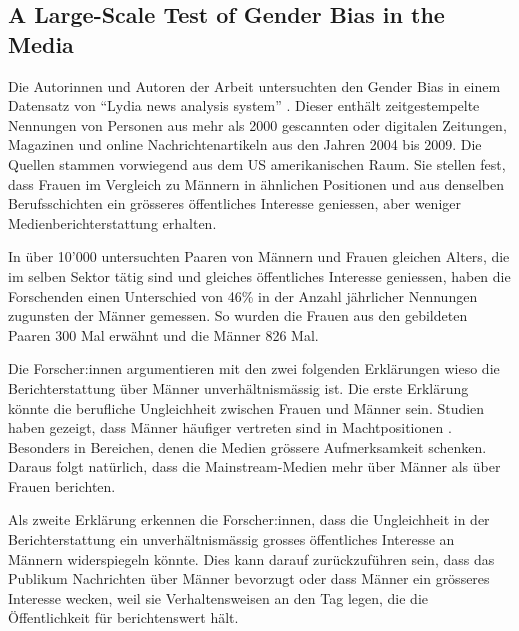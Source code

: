 \subsection{A Large-Scale Test of Gender Bias in the Media}
Die Autorinnen und Autoren der Arbeit  \cite{gender_bias_in_media} untersuchten den Gender Bias in einem
Datensatz von \enquote{Lydia news analysis system} \cite{lydia}. Dieser enthält zeitgestempelte Nennungen von Personen aus
mehr als 2000 gescannten oder digitalen Zeitungen, Magazinen und online Nachrichtenartikeln aus den Jahren 2004 bis 2009.
Die Quellen stammen vorwiegend aus dem US amerikanischen Raum. 
Sie stellen fest, dass Frauen im Vergleich zu Männern in ähnlichen Positionen und aus denselben Berufsschichten ein grösseres öffentliches 
Interesse geniessen, aber weniger Medienberichterstattung erhalten.

In über 10'000 untersuchten Paaren von Männern und Frauen gleichen Alters, die im selben Sektor tätig sind und gleiches öffentliches
Interesse geniessen, haben die Forschenden einen Unterschied von 46\% in der Anzahl jährlicher Nennungen zugunsten der Männer gemessen.
So wurden die Frauen aus den gebildeten Paaren 300 Mal erwähnt und die Männer 826 Mal.


Die Forscher:innen argumentieren mit den zwei folgenden Erklärungen wieso die Berichterstattung über Männer unverhältnismässig ist.
Die erste Erklärung könnte die berufliche Ungleichheit zwischen Frauen und Männer sein.
Studien haben gezeigt, dass Männer häufiger vertreten sind in Machtpositionen
\cite{gender_inequality_in_labor_markets,gender_revolution}. 
Besonders in Bereichen, denen die Medien grössere Aufmerksamkeit schenken.
Daraus folgt natürlich, dass die Mainstream-Medien mehr über Männer als über Frauen berichten.

Als zweite Erklärung erkennen die Forscher:innen, dass die Ungleichheit in der Berichterstattung ein unverhältnismässig grosses öffentliches Interesse an Männern widerspiegeln könnte.
Dies kann darauf zurückzuführen sein, dass das Publikum Nachrichten über Männer bevorzugt oder dass Männer ein grösseres Interesse wecken, 
weil sie Verhaltensweisen an den Tag legen, die die Öffentlichkeit für berichtenswert hält.

